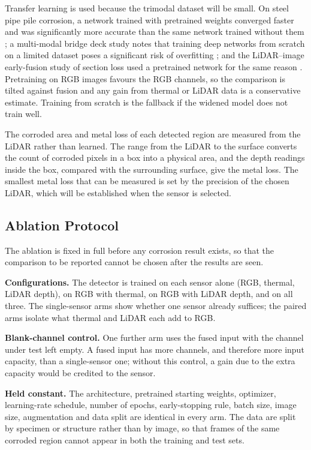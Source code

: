 Transfer learning is used because the trimodal dataset will be small. On steel
pipe pile corrosion, a network trained with pretrained weights converged faster
and was significantly more accurate than the same network trained without them
\citep{Han2024}; a multi-modal bridge deck study notes that training deep
networks from scratch on a limited dataset poses a significant risk of
overfitting \citep{Rashidi2026}; and the LiDAR--image early-fusion study of
section loss used a pretrained network for the same reason \citep{Maru2025}.
Pretraining on RGB images favours the RGB channels, so the comparison is tilted
against fusion and any gain from thermal or LiDAR data is a conservative
estimate. Training from scratch is the fallback if the widened model does not
train well.

The corroded area and metal loss of each detected region are measured from the
LiDAR rather than learned. The range from the LiDAR to the surface converts the
count of corroded pixels in a box into a physical area, and the depth readings
inside the box, compared with the surrounding surface, give the metal loss. The
smallest metal loss that can be measured is set by the precision of the chosen
LiDAR, which will be established when the sensor is selected.

\subsection{Ablation Protocol}
\label{sec:ablation}

The ablation is fixed in full before any corrosion result exists, so that the
comparison to be reported cannot be chosen after the results are seen.

\textbf{Configurations.} The detector is trained on each sensor alone (RGB,
thermal, LiDAR depth), on RGB with thermal, on RGB with LiDAR depth, and on all
three. The single-sensor arms show whether one sensor already suffices; the
paired arms isolate what thermal and LiDAR each add to RGB.

\textbf{Blank-channel control.} One further arm uses the fused input with the
channel under test left empty. A fused input has more channels, and therefore
more input capacity, than a single-sensor one; without this control, a gain due
to the extra capacity would be credited to the sensor.

\textbf{Held constant.} The architecture, pretrained starting weights, optimizer,
learning-rate schedule, number of epochs, early-stopping rule, batch size, image
size, augmentation and data split are identical in every arm. The data are split
by specimen or structure rather than by image, so that frames of the same
corroded region cannot appear in both the training and test sets.

